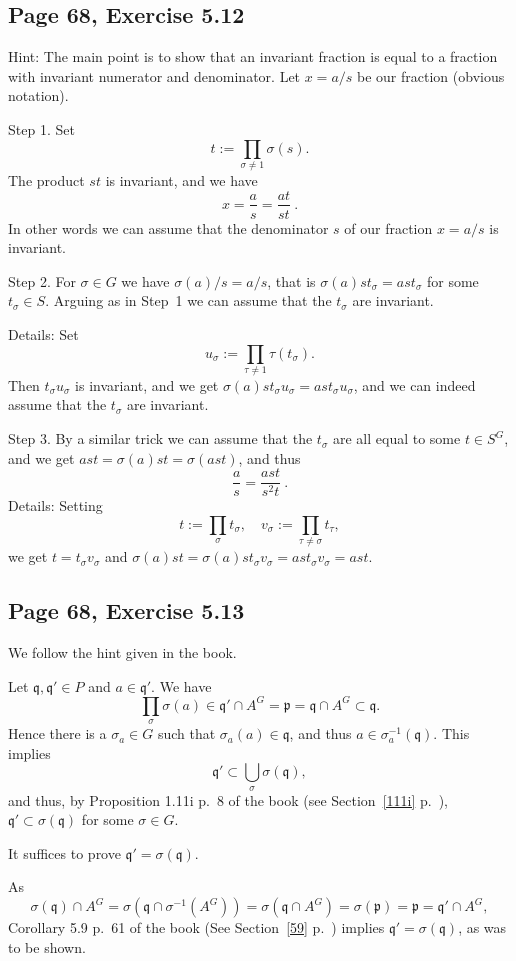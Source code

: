 \documentclass[parskip=half,fontsize=12pt]{scrartcl}%
\newcommand{\mf}{\mathfrak}
\newcommand{\ppp}{\mf p}
\newcommand{\qqq}{\mf q}
\begin{document}
\subsection{Page 68, Exercise 5.12}%

Hint: The main point is to show that an invariant fraction is equal to a fraction with invariant numerator and denominator. Let $x=a/s$ be our fraction (obvious notation). 

Step 1. Set 
$$
t:=\prod_{\sigma\ne1}\sigma(s).
$$ 
The product $st$ is invariant, and we have 
$$
x=\frac{a}{s}=\frac{at}{st}\ .
$$ 
In other words we can assume that the denominator $s$ of our fraction $x=a/s$ is invariant.

Step 2. For $\sigma\in G$ we have $\sigma(a)/s=a/s$, that is $\sigma(a)st_\sigma=ast_\sigma$ for some $t_\sigma\in S$. Arguing as in Step~1 we can assume that the $t_\sigma$ are invariant. 

Details: Set 
$$
u_\sigma:=\prod_{\tau\ne1}\tau(t_\sigma).
$$ 
Then $t_\sigma u_\sigma$ is invariant, and we get $\sigma(a)st_\sigma u_\sigma=ast_\sigma u_\sigma$, and we can indeed assume that the $t_\sigma$ are invariant.

Step 3. By a similar trick we can assume that the $t_\sigma$ are all equal to some $t\in S^G$, and we get $ast=\sigma(a)st=\sigma(ast)$, and thus 
$$
\frac{a}{s}=\frac{ast}{s^2t}\ .
$$ 
Details: Setting 
$$
t:=\prod_\sigma t_\sigma,\quad v_\sigma:=\prod_{\tau\ne\sigma}t_\tau,
$$ 
we get $t=t_\sigma v_\sigma$ and $\sigma(a)st=\sigma(a)st_\sigma v_\sigma=ast_\sigma v_\sigma=ast$.

\subsection{Page 68, Exercise 5.13}%

We follow the hint given in the book.

Let $\qqq,\qqq'\in P$ and $a\in\qqq'$. We have  
$$
\prod_\sigma\sigma(a)\in\qqq'\cap A^G=\ppp=\qqq\cap A^G\subset\qqq.
$$ 
Hence there is a $\sigma_a\in G$ such that $\sigma_a(a)\in\qqq$, and thus $a\in\sigma_a^{-1}(\qqq)$. This implies 
$$
\qqq'\subset\bigcup_\sigma\sigma(\qqq),
$$ 
and thus, by Proposition 1.11i p.~8 of the book (see Section~\ref{111i} p.~\pageref{111i}), $\qqq'\subset\sigma(\qqq)$ for some $\sigma\in G$. 

It suffices to prove $\qqq'=\sigma(\qqq)$.

As 
$$
\sigma(\qqq)\cap A^G=\sigma\left(\qqq\cap\sigma^{-1}(A^G)\right)=\sigma\left(\qqq\cap A^G\right)=\sigma(\ppp)=\ppp=\qqq'\cap A^G,
$$ 
Corollary 5.9 p.~61 of the book (See Section~\ref{59} p.~\pageref{59}) implies $\qqq'=\sigma(\qqq)$, as was to be shown.
\end{document}
